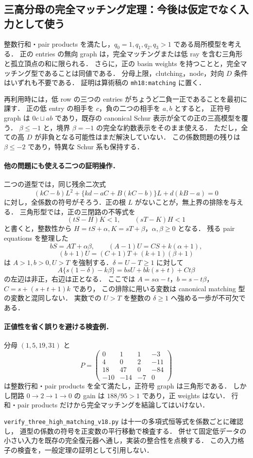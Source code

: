 \subsection{三高分母の完全マッチング定理：今後は仮定でなく入力として使う}
\label{nm18:matching}

整数行和・pair products を満たし，$q_0=1,q_1,q_2,q_3>1$ である局所模型を考える．
正の entries の無向 graph は，完全マッチングまたは低 ray を含む三角形と孤立頂点の和に限られる．
さらに，正の basin weights を持つことと，完全マッチング型であることは同値である．
分母上限，clutching，node，対向 $D$ 条件はいずれも不要である．
証明は算術稿の \texttt{mh18:matching} に置く．

再利用時には，低 row の三つの entries がちょうど二負一正であることを最初に課す．
正の低 entry の相手を $c$，負の二つの相手を $a,b$ とすると，
正符号 graph は $0c\sqcup ab$ であり，既存の canonical Schur 表示が全ての正の三高模型を覆う．
$\beta\le-1$ と，境界 $\beta=-1$ の完全な約数表示をそのまま使える．
ただし，全ての高 $D$ が非負となる可能性はまだ解決していない．
この係数問題の残りは $\beta\le-2$ であり，特異な Schur 系も保持する．

\paragraph{他の問題にも使える二つの証明操作．}
二つの道型では，同じ残余二次式
\[
 (kC-b)L^2+\{kd-aC+B(kC-b)\}L+d(kB-a)=0
\]
に対し，全係数の符号がそろう．正の根 $L$ がないことが，無上界の排除を与える．
三角形型では，正の三閉路の不等式を
\[
 (tS-H)K<1,\qquad (sT-K)H<1
\]
と書くと，整数性から $H=tS+\alpha,K=sT+\beta$，$\alpha,\beta\ge0$ となる．
残る pair equations を整理した
\[
 bS=AT+\alpha\beta,\qquad
 (A-1)U=CS+k(\alpha+1),
\]
\[
 (b+1)U=(C+1)T+(k+1)(\beta+1)
\]
は $A>1,b>0,U>T$ を強制する．$\delta=U-T\ge1$ に対して
\[
 A\{s(1-\delta)-k\beta\}=bsU+bk(s+t)+Ct\beta
\]
の左辺は非正，右辺は正となる．
ここでは $A=s\alpha-t$，$b=s-t\beta$，$C=s+(s+t+1)k$ であり，
この排除に用いる変数は canonical matching 型の変数と混同しない．
実数での $U>T$ を整数の $\delta\ge1$ へ強める一歩が不可欠である．

\paragraph{正値性を省く誤りを避ける検査例．}
分母 $(1,5,19,31)$ と
\[
 P=\begin{pmatrix}
 0&1&1&-3\\4&0&2&-11\\18&47&0&-84\\-10&-14&-7&0
 \end{pmatrix}
\]
は整数行和・pair products を全て満たし，正符号 graph は三角形である．
しかし閉路 $0\to2\to1\to0$ の gain は $188/95>1$ であり，正 weights はない．
行和・pair products だけから完全マッチングを結論してはいけない．

\nolinkurl{verify_three_high_matching_v18.py} は十一の多項式恒等式を係数ごとに確認し，
道型の係数の符号を正変数の平行移動で検査する．
併せて固定低データの小さい入力を既存の完全復元器へ通し，実装の整合性を点検する．
この入力格子の検査を，一般定理の証明として引用しない．

